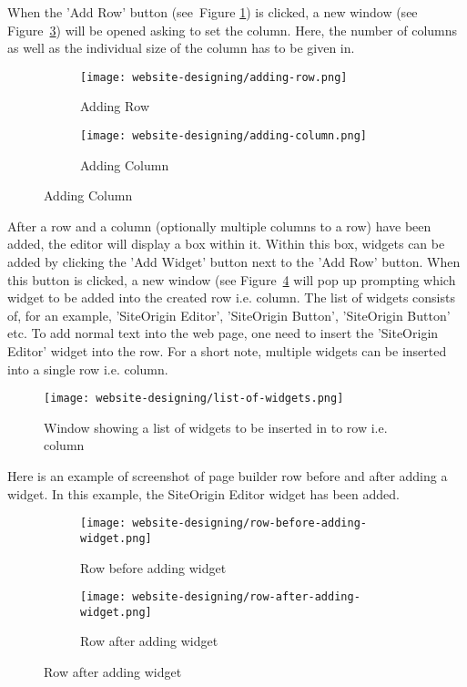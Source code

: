 When the 'Add Row' button (see~Figure \ref{adding-row}) is clicked, a new window (see Figure~\ref{adding-column}) will be opened asking to set the column. Here, the number of columns as well as the individual size of the column has to be given in.

\begin{figure}[ht]
\centering
	\begin{subfigure}{.49\linewidth}
	\centering
	\caption{Adding Row}
	\label{adding-row}
	\texttt{[image: website-designing/adding-row.png]}
	\end{subfigure}
	\begin{subfigure}{0.49\linewidth}
	\centering
	\caption{Adding Column}
	\label{adding-column}
	\texttt{[image: website-designing/adding-column.png]}
	\end{subfigure}
\end{figure}

After a row and a column (optionally multiple columns to a row) have been added, the editor will display a box within it. Within this box, widgets can be added by clicking the 'Add Widget' button next to the 'Add Row' button. When this button is clicked, a new window (see Figure~\ref{list-of-widgets} will pop up prompting which widget to be added into the created row i.e. column. The list of widgets consists of, for an example, 'SiteOrigin Editor', 'SiteOrigin Button', 'SiteOrigin Button' etc. To add normal text into the web page, one need to insert the 'SiteOrigin Editor' widget into the row. For a short note, multiple widgets can be inserted into a single row i.e. column.

\begin{figure}[ht]
\centering
\caption{Window showing a list of widgets to be inserted in to row i.e. column}
\label{list-of-widgets}
\texttt{[image: website-designing/list-of-widgets.png]}
\end{figure}

Here is an example of screenshot of page builder row before and after adding a widget. In this example, the SiteOrigin Editor widget has been added.

\begin{figure}[ht]
\centering
	\begin{subfigure}{.49\linewidth}
	\centering
	\caption{Row before adding widget}
	\label{row-before-adding-widget}
	\texttt{[image: website-designing/row-before-adding-widget.png]}
	\end{subfigure}
	\begin{subfigure}{0.49\linewidth}
	\centering
	\caption{Row after adding widget}
	\label{Row after adding widget}
	\texttt{[image: website-designing/row-after-adding-widget.png]}
	\end{subfigure}
\end{figure}

